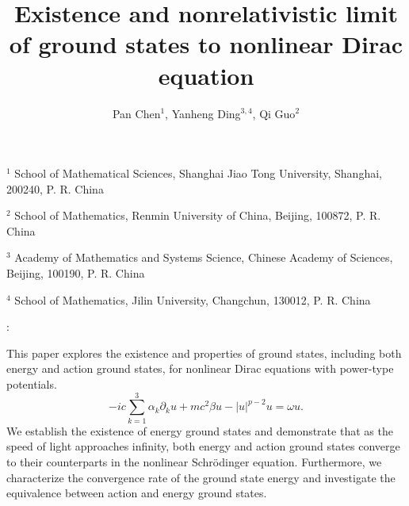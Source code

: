 \documentclass{amsart}
\theoremstyle{plain}
\theoremstyle{definition}
\theoremstyle{remark}
\numberwithin{equation}{section} \numberwithin{figure}{section}
\begin{document}
\title{Existence and nonrelativistic limit of ground states to nonlinear Dirac equation
}
 
\author{Pan Chen$^{1}$, Yanheng Ding$^{3,4}$, Qi Guo$^{2}$ }

\maketitle



\begin{center}
{\small $^1$ School of Mathematical Sciences, Shanghai Jiao Tong University, Shanghai, 200240, P. R. China       }

{\small $^{2}$ School of Mathematics, Renmin University of China, Beijing,  100872, P. R. China  }

  {\small $^3$ Academy of Mathematics and Systems Science, Chinese Academy of Sciences, Beijing, 100190, P. R. China  }


{\small $^4$ School of Mathematics, Jilin University, Changchun, 130012, P. R. China }
\end{center}

 

:
{\small  This paper explores the existence and properties of ground states, including both energy and action ground states, for nonlinear Dirac equations with power-type potentials.
\begin{equation*}
-i c\sum\limits_{k=1}^3\alpha_k\partial_k u  +mc^2 \beta {u}- |{u}|^{p-2}{u}=\omega {u}.
\end{equation*}
We establish the existence of energy ground states and demonstrate that as the speed of light approaches infinity, both energy and action ground states converge to their counterparts in the nonlinear Schr\"odinger equation. Furthermore, we characterize the convergence rate of the ground state energy and investigate the equivalence between action and energy ground states.




}
 
\end{document}
